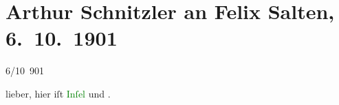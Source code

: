 

\renewcommand{\erwaehntePersonen}{Personen: Otto Eisenschitz, Edmond Huot de Goncourt, Friedrich Hebbel, Gottfried Keller, Catulle Mendès, Felix Salten, Hugo Salus, Pierre Veber}
\renewcommand{\erwaehnteInstitutionen}{Institutionen: Jung-Wiener Theater zum Lieben Augustin}
\renewcommand{\erwaehnteOrte}{Orte: Wien}
\renewcommand{\erwaehnteWerke}{Werke: Altes Ghettoliedchen, Am Fenster, Das Pfeifchen, Die Insel, Illustrirtes Wiener Extrablatt, Klage der Magd, Schlange}
\section[Arthur Schnitzler an Felix Salten, 6. 10. 1901]{Arthur Schnitzler an Felix Salten, 6. 10. 1901}
\nopagebreak{}
\rehead{ }\normalsize\beginnumbering{}
\toendnotes[C]{\smallbreak\pagebreak[2]}
\toendnotes[C]{\smallbreak}
\pstart
           \raggedleft{}{\pb}6/10 901\pend
           
\pstart
           lieber, hier iſt \textcolor{green}{Inſel}{}\ledrightnote{\textcolor{green}{Die Insel}} und
                  \label{K_L02971-11v}\label{K_L02971-11h}. \pend
           

